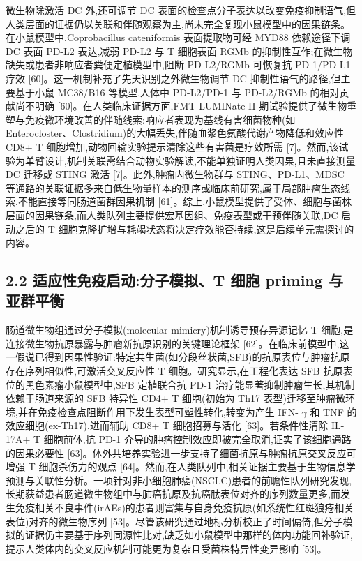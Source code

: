 微生物除激活 DC 外,还可调节 DC 表面的检查点分子表达以改变免疫抑制语气,但人类层面的证据仍以关联和伴随观察为主,尚未完全复现小鼠模型中的因果链条。在小鼠模型中,Coprobacillus cateniformis 表面提取物可经 MYD88 依赖途径下调 DC 表面 PD-L2 表达,减弱 PD-L2 与 T 细胞表面 RGMb 的抑制性互作;在微生物缺失或患者非响应者粪便定植模型中,阻断 PD-L2/RGMb 可恢复抗 PD-1/PD-L1 疗效 {[}60{]}。这一机制补充了先天识别之外微生物调节 DC 抑制性语气的路径,但主要基于小鼠 MC38/B16 等模型,人体中 PD-L2/PD-1 与 PD-L2/RGMb 的相对贡献尚不明确 {[}60{]}。在人类临床证据方面,FMT-LUMINate II 期试验提供了微生物重塑与免疫微环境改善的伴随线索:响应者表现为基线有害细菌物种(如 Enterocloster、Clostridium)的大幅丢失,伴随血浆色氨酸代谢产物降低和效应性 CD8+ T 细胞增加,动物回输实验提示清除这些有害菌是疗效所需 {[}7{]}。然而,该试验为单臂设计,机制关联需结合动物实验解读,不能单独证明人类因果,且未直接测量 DC 迁移或 STING 激活 {[}7{]}。此外,肿瘤内微生物群与 STING、PD-L1、MDSC 等通路的关联证据多来自低生物量样本的测序或临床前研究,属于局部肿瘤生态线索,不能直接等同肠道菌群因果机制 {[}61{]}。综上,小鼠模型提供了受体、细胞与菌株层面的因果链条,而人类队列主要提供宏基因组、免疫表型或干预伴随关联,DC 启动之后的 T 细胞克隆扩增与耗竭状态将决定疗效能否持续,这是后续单元需探讨的内容。

\subsection{2.2 适应性免疫启动:分子模拟、T 细胞 priming 与亚群平衡}\label{ux9002ux5e94ux6027ux514dux75abux542fux52a8ux5206ux5b50ux6a21ux62dft-ux7ec6ux80de-priming-ux4e0eux4e9aux7fa4ux5e73ux8861}

肠道微生物组通过分子模拟(molecular mimicry)机制诱导预存异源记忆 T 细胞,是连接微生物抗原暴露与肿瘤新抗原识别的关键理论框架 {[}62{]}。在临床前模型中,这一假说已得到因果性验证:特定共生菌(如分段丝状菌,SFB)的抗原表位与肿瘤抗原存在序列相似性,可激活交叉反应性 T 细胞。研究显示,在工程化表达 SFB 抗原表位的黑色素瘤小鼠模型中,SFB 定植联合抗 PD-1 治疗能显著抑制肿瘤生长,其机制依赖于肠道来源的 SFB 特异性 CD4+ T 细胞(初始为 Th17 表型)迁移至肿瘤微环境,并在免疫检查点阻断作用下发生表型可塑性转化,转变为产生 IFN- \(\gamma\) 和 TNF 的效应细胞(ex-Th17),进而辅助 CD8+ T 细胞招募与活化 {[}63{]}。若条件性清除 IL-17A+ T 细胞前体,抗 PD-1 介导的肿瘤控制效应即被完全取消,证实了该细胞通路的因果必要性 {[}63{]}。体外共培养实验进一步支持了细菌抗原与肿瘤抗原交叉反应可增强 T 细胞杀伤力的观点 {[}64{]}。然而,在人类队列中,相关证据主要基于生物信息学预测与关联性分析。一项针对非小细胞肺癌(NSCLC)患者的前瞻性队列研究发现,长期获益患者肠道微生物组中与肺癌抗原及抗癌肽表位对齐的序列数量更多,而发生免疫相关不良事件(irAEs)的患者则富集与自身免疫抗原(如系统性红斑狼疮相关表位)对齐的微生物序列 {[}53{]}。尽管该研究通过地标分析校正了时间偏倚,但分子模拟的证据仍主要基于序列同源性比对,缺乏如小鼠模型中那样的体内功能回补验证,提示人类体内的交叉反应机制可能更为复杂且受菌株特异性变异影响 {[}53{]}。


